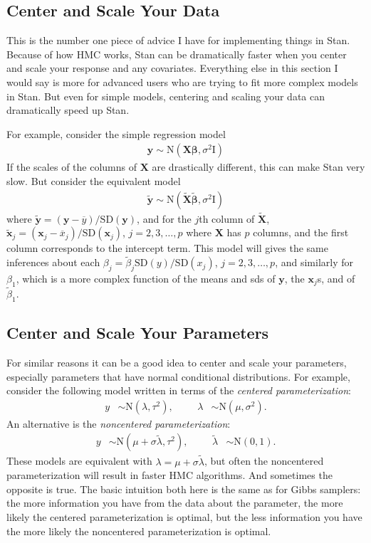 \documentclass{article}
\begin{document}
\subsection{Center and Scale Your Data}
This is the number one piece of advice I have for implementing things in Stan. Because of how HMC works, Stan can be dramatically faster when you center and scale your response and any covariates. Everything else in this section I would say is more for advanced users who are trying to fit more complex models in Stan. But even for simple models, centering and scaling your data can dramatically speed up Stan.

For example, consider the simple regression model
\begin{align*}
\bm{y} \sim \mathrm{N}(\bm{X}\bm{\beta}, \sigma^2\bm{\mathrm{I}})
\end{align*}
If the scales of the columns of $\bm{X}$ are drastically different, this can make Stan very slow. But consider the equivalent model
\begin{align*}
\widetilde{\bm{y}} \sim \mathrm{N}(\widetilde{\bm{X}}\widetilde{\bm{\beta}}, \sigma^2\bm{\mathrm{I}})
\end{align*}
where $\widetilde{\bm{y}} = (\bm{y} - \overline{y})/\mathrm{SD}(\bm{y})$, and for the $j$th column of $\widetilde{\bm{X}}$, $\widetilde{\bm{x}}_j = (\bm{x}_j - \overline{x}_j)/\mathrm{SD}(\bm{x}_j)$, $j=2,3,\dots,p$ where $\bm{X}$ has $p$ columns, and the first column corresponds to the intercept term. This model will gives the same inferences about each $\beta_j = \widetilde{\beta}_j\mathrm{SD}(y)/\mathrm{SD}(x_j)$, $j=2,3,\dots,p$, and similarly for $\beta_1$, which is a more complex function of the means and sds of $\bm{y}$, the $\bm{x}_j$s, and of $\widetilde{\beta}_1$. 

\subsection{Center and Scale Your Parameters}
For similar reasons it can be a good idea to center and scale your parameters, especially parameters that have normal conditional distributions. For example, consider the following model written in terms of the \emph{centered parameterization}:
\begin{align*}
y &\sim \mathrm{N}(\lambda, \tau^2), &&& \lambda &\sim \mathrm{N}(\mu, \sigma^2).
\end{align*}
An alternative is the \emph{noncentered parameterization}:
\begin{align*}
y &\sim \mathrm{N}(\mu + \sigma\widetilde{\lambda}, \tau^2), &&& \widetilde{\lambda} &\sim \mathrm{N}(0, 1).
\end{align*}
These models are equivalent with $\lambda = \mu + \sigma\widetilde{\lambda}$, but often the noncentered parameterization will result in faster HMC algorithms. And sometimes the opposite is true. The basic intuition both here is the same as for Gibbs samplers: the more information you have from the data about the parameter, the more likely the centered parameterization is optimal, but the less information you have the more likely the noncentered parameterization is optimal.
\end{document}
